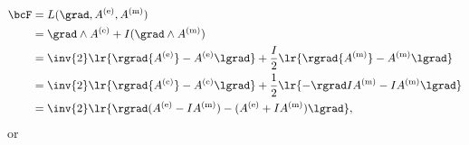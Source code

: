 \begin{equation}\label{eqn:potentialMethods:980}
\begin{aligned}
\bcF
&= L(\grad, {A^\e}, {A^\m}) \\
&= \grad \wedge {A^\e} + I (\grad \wedge {A^\m}) \\
&= \inv{2} \lr{ \rgrad {A^\e} - {A^\e} \lgrad } + \frac{I}{2} \lr{ \rgrad {A^\m} - {A^\m} \lgrad } \\
&= \inv{2} \lr{ \rgrad {A^\e} - {A^\e} \lgrad } + \frac{1}{2} \lr{ -\rgrad I {A^\m} - I {A^\m} \lgrad } \\
&= \inv{2} \lr{ \rgrad ({A^\e} -I {A^\m}) - ({A^\e} + I {A^\m}) \lgrad },
\end{aligned}
\end{equation}
or

